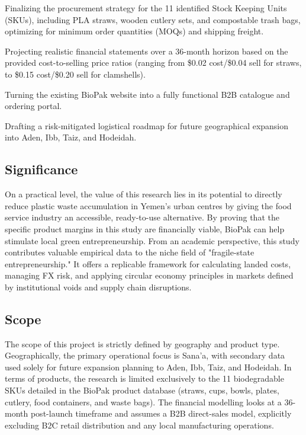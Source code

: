 \documentclass[12pt,a4paper]{article}
\begin{document}
Finalizing the procurement strategy for the 11 identified Stock Keeping Units (SKUs), including PLA straws, wooden cutlery sets, and compostable trash bags, optimizing for minimum order quantities (MOQs) and shipping freight.

Projecting realistic financial statements over a 36-month horizon based on the provided cost-to-selling price ratios (ranging from \$0.02 cost/\$0.04 sell for straws, to \$0.15 cost/\$0.20 sell for clamshells).

Turning the existing BioPak website into a fully functional B2B catalogue and ordering portal.

Drafting a risk-mitigated logistical roadmap for future geographical expansion into Aden, Ibb, Taiz, and Hodeidah.

\subsection{Significance}

On a practical level, the value of this research lies in its potential to directly reduce plastic waste accumulation in Yemen's urban centres by giving the food service industry an accessible, ready-to-use alternative. By proving that the specific product margins in this study are financially viable, BioPak can help stimulate local green entrepreneurship. From an academic perspective, this study contributes valuable empirical data to the niche field of "fragile-state entrepreneurship." It offers a replicable framework for calculating landed costs, managing FX risk, and applying circular economy principles in markets defined by institutional voids and supply chain disruptions.

\subsection{Scope}

The scope of this project is strictly defined by geography and product type. Geographically, the primary operational focus is Sana'a, with secondary data used solely for future expansion planning to Aden, Ibb, Taiz, and Hodeidah. In terms of products, the research is limited exclusively to the 11 biodegradable SKUs detailed in the BioPak product database (straws, cups, bowls, plates, cutlery, food containers, and waste bags). The financial modelling looks at a 36-month post-launch timeframe and assumes a B2B direct-sales model, explicitly excluding B2C retail distribution and any local manufacturing operations.
\end{document}
